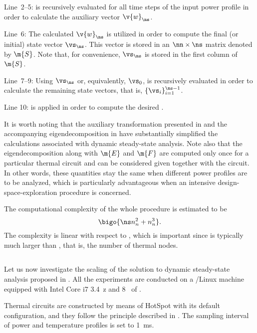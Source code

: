Line~2--5:  is recursively evaluated
for all time steps of the input power profile \mp in order to calculate the
auxiliary vector $\v{w}_\ns$.

Line~6: The calculated $\v{w}_\ns$ is utilized in order to compute the final (or
initial) state vector $\vs_\ns$. This vector is stored in an $\nn \times \ns$
matrix denoted by $\m{S}$. Note that, for convenience, $\vs_\ns$ is stored in
the first column of $\m{S}$.

Line~7--9: Using $\vs_\ns$ or, equivalently, $\vs_0$,
 is recursively evaluated in order to calculate
the remaining state vectors, that is, $\{ \vs_i \}_{i = 1}^{\ns - 1}$.

Line 10:  is applied in order to compute the desired
\mq.

It is worth noting that the auxiliary transformation presented in
 and the accompanying eigendecomposition in
 have substantially simplified the calculations
associated with dynamic steady-state analysis. Note also that the
eigendecomposition along with $\m{E}$ and $\m{F}$ are computed only once for a
particular thermal  circuit and can be considered given together with the
circuit. In other words, these quantities stay the same when different power
profiles are to be analyzed, which is particularly advantageous when an
intensive design-space-exploration procedure is concerned.

The computational complexity of the whole procedure is estimated to be
\[
  \bigo{\ns n_n^2 + n_n^3}.
\]
The complexity is linear with respect to \ns, which is important since \ns is
typically much larger than \nn, that is, the number of thermal nodes.

\subsection{\resultstitle}

Let us now investigate the scaling of the solution to dynamic steady-state
analysis proposed in . All the experiments are
conducted on a /Linux machine equipped with Intel Core i7 3.4~z
and 8~ of .

Thermal  circuits are constructed by means of HotSpot \cite{skadron2003}
with its default configuration, and they follow the principle described in
. The sampling interval \dt of power and temperature
profiles is set to 1~ms.

